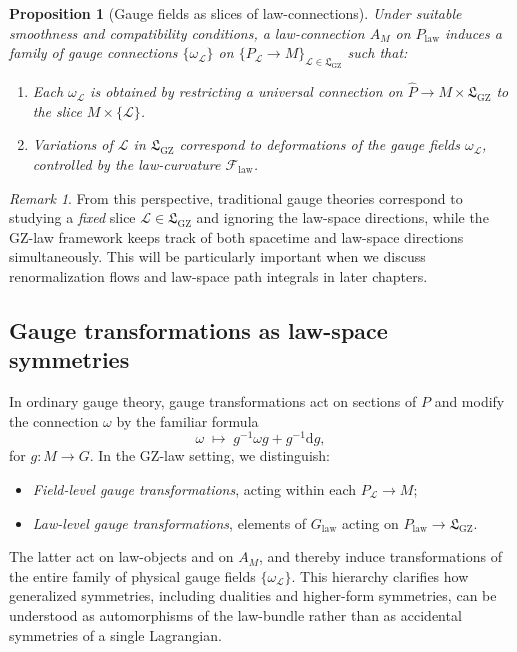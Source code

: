 \documentclass[11pt]{book}
\newcommand{\GZLS}{\ensuremath{\mathfrak{L}_{\mathrm{GZ}}}}
\newcommand{\GZLOC}{\ensuremath{A_M}}
\newcommand{\GZLCurv}{\ensuremath{\mathcal{F}_{\mathrm{law}}}}
\newcommand{\Base}{\ensuremath{M}}
\newcommand{\Bundle}{\ensuremath{P}}
\newcommand{\Group}{\ensuremath{G}}
\newcommand{\Conn}{\ensuremath{\omega}}
\theoremstyle{plain}
\newtheorem{proposition}[theorem]{Proposition}
\theoremstyle{definition}
\theoremstyle{remark}
\newtheorem{remark}[theorem]{Remark}
\begin{document}
\begin{proposition}[Gauge fields as slices of law-connections]
  Under suitable smoothness and compatibility conditions, a
  law-connection $\GZLOC$ on $\Bundle_{\mathrm{law}}$ induces a family
  of gauge connections $\{\Conn_{\mathcal{L}}\}$ on
  $\{\Bundle_{\mathcal{L}} \to \Base\}_{\mathcal{L} \in \GZLS}$ such
  that:
  \begin{enumerate}
    \item Each $\Conn_{\mathcal{L}}$ is obtained by restricting a
          universal connection on $\widehat{\Bundle} \to \Base \times
          \GZLS$ to the slice $\Base \times \{\mathcal{L}\}$.
    \item Variations of $\mathcal{L}$ in $\GZLS$ correspond to
          deformations of the gauge fields $\Conn_{\mathcal{L}}$,
          controlled by the law-curvature $\GZLCurv$.
  \end{enumerate}
\end{proposition}

\begin{remark}
  From this perspective, traditional gauge theories correspond to
  studying a \emph{fixed} slice $\mathcal{L} \in \GZLS$ and ignoring
  the law-space directions, while the GZ-law framework keeps track of
  both spacetime and law-space directions simultaneously. This will be
  particularly important when we discuss renormalization flows and
  law-space path integrals in later chapters.
\end{remark}

\subsection{Gauge transformations as law-space symmetries}

In ordinary gauge theory, gauge transformations act on sections of
$\Bundle$ and modify the connection $\Conn$ by the familiar formula
\[
   \Conn \;\mapsto\; g^{-1} \Conn g + g^{-1} \mathrm{d}g,
\]
for $g \colon \Base \to \Group$. In the GZ-law setting, we distinguish:
\begin{itemize}
  \item \emph{Field-level gauge transformations}, acting within each
        $\Bundle_{\mathcal{L}} \to \Base$;
  \item \emph{Law-level gauge transformations}, elements of
        $G_{\mathrm{law}}$ acting on $\Bundle_{\mathrm{law}} \to
        \GZLS$.
\end{itemize}

The latter act on law-objects and on $\GZLOC$, and thereby induce
transformations of the entire family of physical gauge fields
$\{\Conn_{\mathcal{L}}\}$. This hierarchy clarifies how generalized
symmetries, including dualities and higher-form symmetries, can be
understood as automorphisms of the law-bundle rather than as accidental
symmetries of a single Lagrangian.
\end{document}
